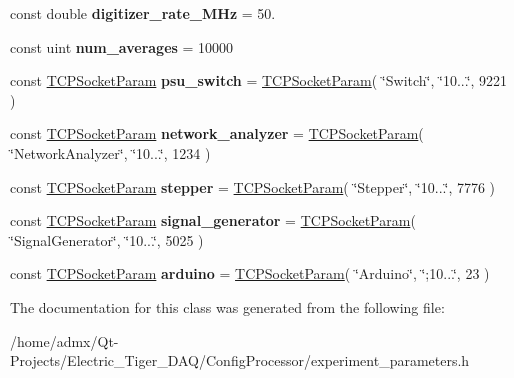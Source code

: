 \begin{DoxyCompactItemize}
\item 
\hypertarget{class_experiment_parameters_acfd9ce58ec8a3407d76c10db7a33168e}{const double {\bfseries digitizer\+\_\+rate\+\_\+\+M\+Hz} = 50.}\label{class_experiment_parameters_acfd9ce58ec8a3407d76c10db7a33168e}

\item 
\hypertarget{class_experiment_parameters_a7434e2b3a7f7eccdc212cc55651922e2}{const uint {\bfseries num\+\_\+averages} = 10000}\label{class_experiment_parameters_a7434e2b3a7f7eccdc212cc55651922e2}

\item 
\hypertarget{class_experiment_parameters_ae700482ce71b3a5558ee41093913297a}{const \hyperlink{struct_t_c_p_socket_param}{T\+C\+P\+Socket\+Param} {\bfseries psu\+\_\+switch} = \hyperlink{struct_t_c_p_socket_param}{T\+C\+P\+Socket\+Param}( \char`\"{}Switch\char`\"{}, \char`\"{}10...\char`\"{}, 9221 )}\label{class_experiment_parameters_ae700482ce71b3a5558ee41093913297a}

\item 
\hypertarget{class_experiment_parameters_afa22bbf371056c9f48ab16fc75ae8bc7}{const \hyperlink{struct_t_c_p_socket_param}{T\+C\+P\+Socket\+Param} {\bfseries network\+\_\+analyzer} = \hyperlink{struct_t_c_p_socket_param}{T\+C\+P\+Socket\+Param}( \char`\"{}Network\+Analyzer\char`\"{}, \char`\"{}10...\char`\"{}, 1234 )}\label{class_experiment_parameters_afa22bbf371056c9f48ab16fc75ae8bc7}

\item 
\hypertarget{class_experiment_parameters_ae51cbbd261707bafe2cfd50cef214cb5}{const \hyperlink{struct_t_c_p_socket_param}{T\+C\+P\+Socket\+Param} {\bfseries stepper} = \hyperlink{struct_t_c_p_socket_param}{T\+C\+P\+Socket\+Param}( \char`\"{}Stepper\char`\"{}, \char`\"{}10...\char`\"{}, 7776 )}\label{class_experiment_parameters_ae51cbbd261707bafe2cfd50cef214cb5}

\item 
\hypertarget{class_experiment_parameters_a3433956c9a6d19db55ce7ea22c3ec731}{const \hyperlink{struct_t_c_p_socket_param}{T\+C\+P\+Socket\+Param} {\bfseries signal\+\_\+generator} = \hyperlink{struct_t_c_p_socket_param}{T\+C\+P\+Socket\+Param}( \char`\"{}Signal\+Generator\char`\"{}, \char`\"{}10...\char`\"{}, 5025 )}\label{class_experiment_parameters_a3433956c9a6d19db55ce7ea22c3ec731}

\item 
\hypertarget{class_experiment_parameters_a3657583fc47ddc41cacc1954297fe8ba}{const \hyperlink{struct_t_c_p_socket_param}{T\+C\+P\+Socket\+Param} {\bfseries arduino} = \hyperlink{struct_t_c_p_socket_param}{T\+C\+P\+Socket\+Param}( \char`\"{}Arduino\char`\"{}, \char`\"{};10...\char`\"{}, 23 )}\label{class_experiment_parameters_a3657583fc47ddc41cacc1954297fe8ba}

\end{DoxyCompactItemize}


The documentation for this class was generated from the following file\+:\begin{DoxyCompactItemize}
\item 
/home/admx/\+Qt-\/\+Projects/\+Electric\+\_\+\+Tiger\+\_\+\+D\+A\+Q/\+Config\+Processor/experiment\+\_\+parameters.\+h\end{DoxyCompactItemize}
